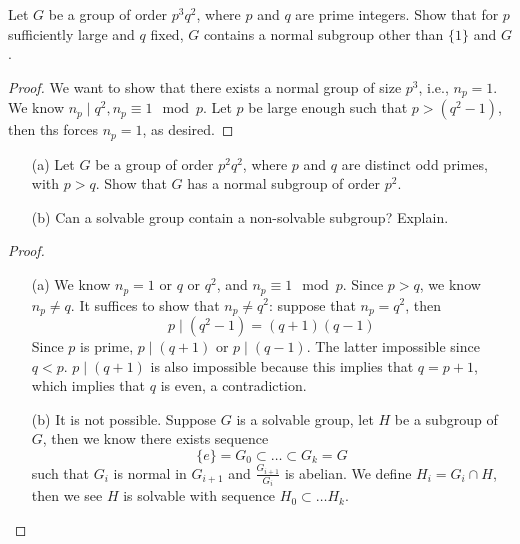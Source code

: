 \begin{prob}[S2012-Q1]
    Let \( G \) be a group of order \( p^3 q^2 \), where \( p \) and \( q \) are prime integers. Show that for \( p \) sufficiently large and \( q \) fixed, \( G \) contains a normal subgroup other than \(\{1\}\) and \( G \).
\end{prob}
\begin{proof}
    We want to show that there exists a normal group of size $p^3$, i.e., $n_p=1$. We know $n_p\mid q^2, n_p\equiv 1\mod p$. Let $p$ be large enough such that $p>(q^2-1)$, then ths forces $n_p=1$, as desired.
\end{proof}





\begin{prob}[F2014-Q4]
    \phantom{text}
    \begin{itemize}
        \item[(a)] Let \( G \) be a group of order \( p^2q^2 \), where \( p \) and \( q \) are distinct odd primes, with \( p > q \). Show that \( G \) has a normal subgroup of order \( p^2 \).
        
        \item[(b)] Can a solvable group contain a non-solvable subgroup? Explain.
    \end{itemize}
\end{prob}
\begin{proof}
    \begin{itemize}
        \item[(a)] We know $n_p=1$ or $q$ or $q^2$, and $n_p\equiv 1\mod p$. Since $p>q$, we know $n_p\neq q$. It suffices to show that $n_p\neq q^2$: suppose that $n_p=q^2$, then 
        \begin{equation*}
            p\mid (q^2-1)=(q+1)(q-1)
        \end{equation*}
        Since $p$ is prime, $p\mid (q+1)$ or $p\mid(q-1)$. The latter impossible since $q<p$. $p\mid (q+1)$ is also impossible because this implies that $q=p+1$, which implies that $q$ is even, a contradiction.
        \item[(b)] It is not possible. Suppose $G$ is a solvable group, let $H$ be a subgroup of $G$, then we know there exists sequence 
        \begin{equation*}
            \{e\}=G_0\subset\dots\subset G_k=G
        \end{equation*}
        such that $G_i$ is normal in $G_{i+1}$ and $\frac{G_{i+1}}{G_i}$ is abelian. We define $H_i=G_i\cap H$, then we see $H$ is solvable with sequence $H_0\subset\dots H_k$.
    \end{itemize}

\end{proof}


